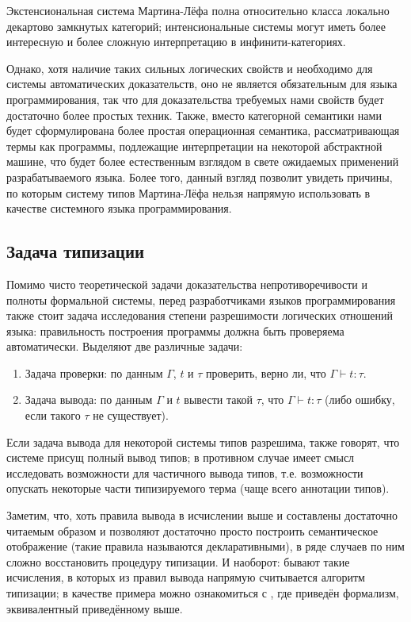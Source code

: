 \documentclass[12pt]{article}
\begin{document}
Экстенсиональная система Мартина-Лёфа полна относительно класса локально
декартово замкнутых категорий; интенсиональные системы могут иметь более
интересную и более сложную интерпретацию в инфинити-категориях.

Однако, хотя наличие таких сильных логических свойств и необходимо для системы
автоматических доказательств, оно не является обязательным для языка
программирования, так что для доказательства требуемых нами свойств будет
достаточно более простых техник. Также, вместо категорной семантики нами будет
сформулирована более простая операционная семантика, рассматривающая термы как
программы, подлежащие интерпретации на некоторой абстрактной машине, что будет
более естественным взглядом в свете ожидаемых применений разрабатываемого языка.
Более того, данный взгляд позволит увидеть причины, по которым систему типов
Мартина-Лёфа нельзя напрямую использовать в качестве системного языка
программирования.

\subsection{Задача типизации}

Помимо чисто теоретической задачи доказательства непротиворечивости и полноты
формальной системы, перед разработчиками языков программирования также стоит
задача исследования степени разрешимости логических отношений языка:
правильность построения программы должна быть проверяема автоматически.
Выделяют две различные задачи:

\begin{enumerate}
  \item Задача проверки: по данным $\Gamma$, $t$ и $\tau$ проверить, верно ли,
    что $\Gamma\vdash t:\tau$.
  \item Задача вывода: по данным $\Gamma$ и $t$ вывести такой $\tau$, что
    $\Gamma\vdash t:\tau$ (либо ошибку, если такого $\tau$ не существует).
\end{enumerate}

Если задача вывода для некоторой системы типов разрешима, также говорят, что
системе присущ полный вывод типов; в противном случае имеет смысл исследовать
возможности для частичного вывода типов, т.е. возможности опускать некоторые
части типизируемого терма (чаще всего аннотации типов).

Заметим, что, хоть правила вывода в исчислении выше и составлены достаточно
читаемым образом и позволяют достаточно просто построить семантическое
отображение (такие правила называются декларативными), в ряде случаев по ним
сложно восстановить процедуру типизации. И наоборот: бывают такие исчисления, в
которых из правил вывода напрямую считывается алгоритм типизации; в качестве
примера можно ознакомиться с \cite{coq}, где приведён формализм, эквивалентный
приведённому выше.
\end{document}
